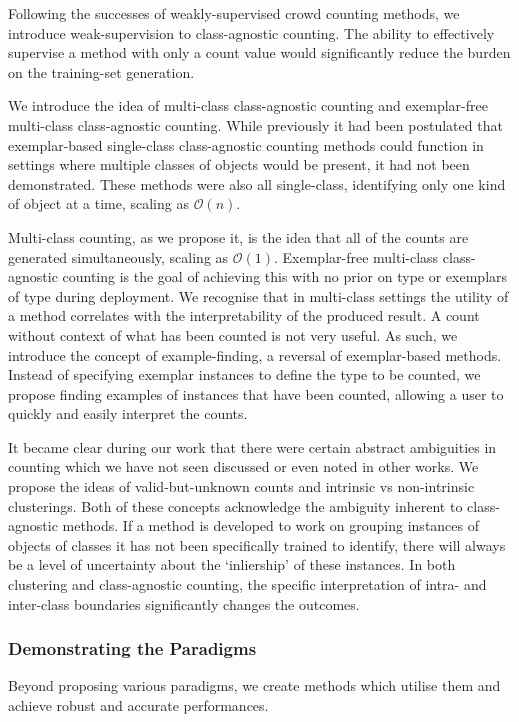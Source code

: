 \documentclass[../thesis.tex]{subfiles}
\begin{document}
Following the successes of weakly-supervised crowd counting methods, we introduce weak-supervision to class-agnostic counting.
The ability to effectively supervise a method with only a count value would significantly reduce the burden on the training-set generation.

We introduce the idea of multi-class class-agnostic counting and exemplar-free multi-class class-agnostic counting.
While previously it had been postulated that exemplar-based single-class class-agnostic counting methods could function in settings where multiple classes of objects would be present, it had not been demonstrated. 
These methods were also all single-class, identifying only one kind of object at a time, scaling as $\mathcal{O}(n)$.

Multi-class counting, as we propose it, is the idea that all of the counts are generated simultaneously, scaling as $\mathcal{O}(1)$.
Exemplar-free multi-class class-agnostic counting is the goal of achieving this with no prior on type or exemplars of type during deployment.
We recognise that in multi-class settings the utility of a method correlates with the interpretability of the produced result. A count without context of what has been counted is not very useful. As such, we introduce the concept of example-finding, a reversal of exemplar-based methods. Instead of specifying exemplar instances to define the type to be counted, we propose finding examples of instances that have been counted, allowing a user to quickly and easily interpret the counts.


It became clear during our work that there were certain abstract ambiguities in counting which we have not seen discussed or even noted in other works.
We propose the ideas of valid-but-unknown counts and intrinsic vs non-intrinsic clusterings.
Both of these concepts acknowledge the ambiguity inherent to class-agnostic methods.
If a method is developed to work on grouping instances of objects of classes it has not been specifically trained to identify, there will always be a level of uncertainty about the `inliership' of these instances.
In both clustering and class-agnostic counting, the specific interpretation of intra- and inter-class boundaries significantly changes the outcomes.






\subsubsection{Demonstrating the Paradigms}
Beyond proposing various paradigms, we create methods which utilise them and achieve robust and accurate performances.
\end{document}
